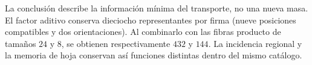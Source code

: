 La conclusión describe la información mínima del transporte, no una
nueva masa. El factor aditivo conserva dieciocho representantes por firma
(nueve posiciones compatibles y dos orientaciones). Al combinarlo con las
fibras producto de tamaños \(24\) y \(8\), se obtienen respectivamente
\(432\) y \(144\). La incidencia regional y la memoria de hoja conservan
así funciones distintas dentro del mismo catálogo.
